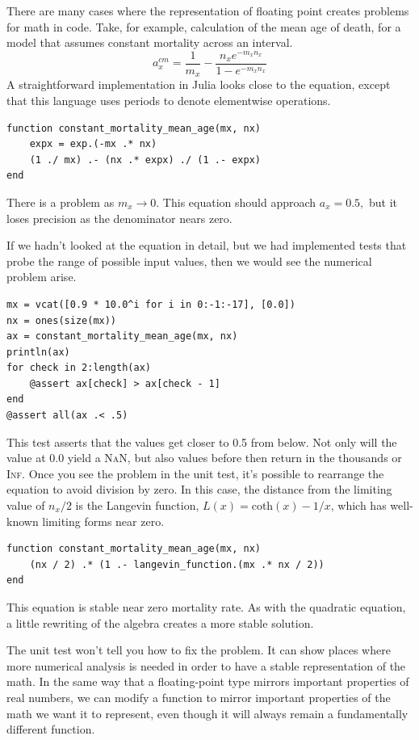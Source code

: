 \documentclass[fleqn,10pt]{olplainarticle}
\newcommand{\nan}{\textsc{NaN}\xspace}
\begin{document}
There are many cases where the representation of floating point
creates problems for math in code. Take, for example, calculation
of the mean age of death, for a model that assumes constant
mortality across an interval.
\begin{equation}
  a_x^{cm} = \frac{1}{m_x} - \frac{n_x e^{-m_x n_x}}{1-e^{-m_x n_x}}
\end{equation}
A straightforward implementation in Julia looks close to the equation,
except that this language uses periods to denote elementwise
operations.
\begin{lstlisting}
function constant_mortality_mean_age(mx, nx)
    expx = exp.(-mx .* nx)
    (1 ./ mx) .- (nx .* expx) ./ (1 .- expx)
end
\end{lstlisting}
There is a problem as $m_x\rightarrow 0$. This equation should
approach $a_x=0.5,$ but it loses precision as the denominator
nears zero.

If we hadn't looked at the equation in detail, but we had implemented
tests that probe the range of possible input values, then
we would see the numerical problem arise.
\begin{lstlisting}
mx = vcat([0.9 * 10.0^i for i in 0:-1:-17], [0.0])
nx = ones(size(mx))
ax = constant_mortality_mean_age(mx, nx)
println(ax)
for check in 2:length(ax)
    @assert ax[check] > ax[check - 1]
end
@assert all(ax .< .5)
\end{lstlisting}
This test asserts that the values get closer to 0.5 from below.
Not only will the value at 0.0 yield a \nan, but also
values before then return in the thousands or \textsc{Inf}.
Once you see the problem in the unit test, it's possible
to rearrange the equation to avoid
division by zero. In this case, the distance from the limiting
value of $n_x/2$ is the Langevin function, $L(x) = \mbox{coth}(x) - 1/x$,
which has well-known limiting forms near zero.
\begin{lstlisting}
function constant_mortality_mean_age(mx, nx)
    (nx / 2) .* (1 .- langevin_function.(mx .* nx / 2))
end
\end{lstlisting}
This equation is stable near zero mortality rate.
As with the quadratic equation, a little rewriting of the
algebra creates a more stable solution.

The unit test won't tell you how to fix the problem.
It can show places where more numerical analysis is
needed in order to have a stable representation of the math.
In the same way that a floating-point type mirrors important
properties of real numbers, we can modify a function to
mirror important properties of the math we want it to represent,
even though it will always remain a fundamentally different function.
\end{document}
